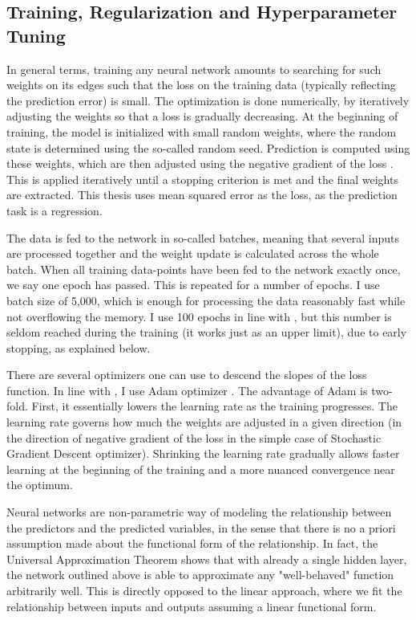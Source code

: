 	
	\subsection{Training, Regularization and Hyperparameter Tuning}
		\label{chap:train_regularize_tune}
	
		In general terms, training any neural network amounts to searching for such weights on its edges such that the loss on the training data (typically reflecting the prediction error) is small. The optimization is done numerically, by iteratively adjusting the weights so that a loss is gradually decreasing. At the beginning of training, the model is initialized with small random weights, where the random state is determined using the so-called random seed. Prediction is computed using these weights, which are then adjusted using the negative gradient of the loss \citep{kingma2014adam}. This is applied iteratively until a stopping criterion is met and the final weights are extracted. This thesis uses mean squared error as the loss, as the prediction task is a regression.
		
		The data is fed to the network in so-called batches, meaning that several inputs are processed together and the weight update is calculated across the whole batch. When all training data-points have been fed to the network exactly once, we say one epoch has passed. This is repeated for a number of epochs. I use batch size of 5,000, which is enough for processing the data reasonably fast while not overflowing the memory. I use 100 epochs in line with \cite{gu2020empirical}, but this number is seldom reached during the training (it works just as an upper limit), due to early stopping, as explained below.
		
		There are several optimizers one can use to descend the slopes of the loss function. In line with \cite{gu2020empirical}, I use Adam optimizer \citep{kingma2014adam}. The advantage of Adam is two-fold. First, it essentially lowers the learning rate as the training progresses. The learning rate governs how much the weights are adjusted in a given direction (in the direction of negative gradient of the loss in the simple case of Stochastic Gradient Descent optimizer). Shrinking the learning rate gradually allows faster learning at the beginning of the training and a more nuanced convergence near the optimum.
		
		Neural networks are non-parametric way of modeling the relationship between the predictors and the predicted variables, in the sense that there is no a priori assumption made about the functional form of the relationship. In fact, the Universal Approximation Theorem shows that with already a single hidden layer, the network outlined above is able to approximate any "well-behaved" function arbitrarily well. This is directly opposed to the linear approach, where we fit the relationship between inputs and outputs assuming a linear functional form. 
		

